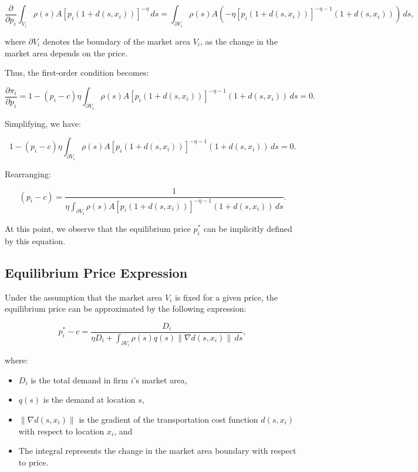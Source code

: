 \[
\frac{\partial}{\partial p_i} \int_{V_i} \rho(s) A \left[ p_i (1 + d(s, x_i)) \right]^{-\eta} \, ds = \int_{\partial V_i} \rho(s) A \left( -\eta \left[ p_i (1 + d(s, x_i)) \right]^{-\eta-1} (1 + d(s, x_i)) \right) \, ds,
\]

where \( \partial V_i \) denotes the boundary of the market area \( V_i \), as the change in the market area depends on the price.

Thus, the first-order condition becomes:

\[
\frac{\partial \pi_i}{\partial p_i} = 1 - (p_i - c) \eta \int_{\partial V_i} \rho(s) A \left[ p_i (1 + d(s, x_i)) \right]^{-\eta-1} (1 + d(s, x_i)) \, ds = 0.
\]

Simplifying, we have:

\[
1 - (p_i - c) \eta \int_{\partial V_i} \rho(s) A \left[ p_i (1 + d(s, x_i)) \right]^{-\eta-1} (1 + d(s, x_i)) \, ds = 0.
\]

Rearranging:

\[
(p_i - c) = \frac{1}{\eta \int_{\partial V_i} \rho(s) A \left[ p_i (1 + d(s, x_i)) \right]^{-\eta-1} (1 + d(s, x_i)) \, ds}.
\]

At this point, we observe that the equilibrium price \( p_i^* \) can be implicitly defined by this equation.

\subsection*{Equilibrium Price Expression}

Under the assumption that the market area \( V_i \) is fixed for a given price, the equilibrium price can be approximated by the following expression:

\[
p_i^* - c = \frac{D_i}{\eta D_i + \int_{\partial V_i} \rho(s) q(s) \|\nabla d(s, x_i)\| \, ds},
\]

where:

\begin{itemize}
    \item \( D_i \) is the total demand in firm \( i \)'s market area,
    \item \( q(s) \) is the demand at location \( s \),
    \item \( \|\nabla d(s, x_i)\| \) is the gradient of the transportation cost function \( d(s, x_i) \) with respect to location \( x_i \), and
    \item The integral represents the change in the market area boundary with respect to price.
\end{itemize}

